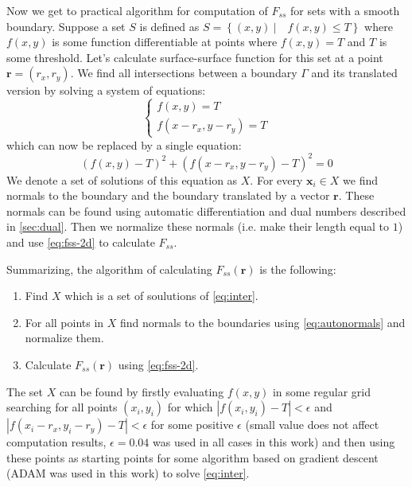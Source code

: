 \documentclass[reprint,amsmath,amssymb,aps,pre,showkeys,showpacs]{revtex4-1}
\begin{document}
Now we get to practical algorithm for computation of $F_{ss}$ for sets with a
smooth boundary. Suppose a set $S$ is defined as
$S = \left\{ (x, y) \ | \quad f(x, y) \le T \right\}$ where $f(x, y)$ is some
function differentiable at points where $f(x, y) = T$ and $T$ is some
threshold. Let's calculate surface-surface function for this set at a point
$\bm{r} = (r_x, r_y)$. We find all intersections between a boundary $\Gamma$ and
its translated version by solving a system of equations:
\begin{equation*}
  \left\{
  \begin{array}{l}
    f(x, y) = T \\
    f(x-r_x, y-r_y) = T
  \end{array}
  \right.
\end{equation*}
which can now be replaced by a single equation:
\begin{equation}
  (f(x, y) - T)^2 + (f(x-r_x, y-r_y) - T)^2 = 0 \label{eq:inter}
\end{equation}
We denote a set of solutions of this equation as $X$. For every $\bm{x}_i \in X$
we find normals to the boundary and the boundary translated by a vector
$\bm{r}$. These normals can be found using automatic differentiation and dual
numbers described in \cref{sec:dual}. Then we normalize these normals (i.e. make
their length equal to $1$) and use \cref{eq:fss-2d} to calculate $F_{ss}$.

Summarizing, the algorithm of calculating $F_{ss}(\bm{r})$ is the following:
\begin{enumerate}
\item Find $X$ which is a set of soulutions of \cref{eq:inter}.
\item For all points in $X$ find normals to the boundaries using
  \cref{eq:autonormals} and normalize them.
\item Calculate $F_{ss}(\bm{r})$ using \cref{eq:fss-2d}.
\end{enumerate}

The set $X$ can be found by firstly evaluating $f(x, y)$ in some regular grid
searching for all points $(x_i, y_i)$ for which $|f(x_i, y_i) - T| < \epsilon$
and $|f(x_i - r_x, y_i - r_y) - T| < \epsilon$ for some positive $\epsilon$ 
(small value does not affect computation results, $\epsilon=0.04$ was used in all cases in this work)
and then using these points as starting points for some algorithm based on
gradient descent (ADAM \cite{adam} was used in this work) to solve \cref{eq:inter}.
\end{document}

